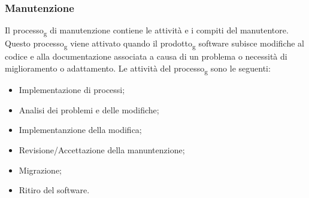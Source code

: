 \subsubsection{Manutenzione}
Il processo\textsubscript{g} di manutenzione contiene le attività e i compiti del manutentore. Questo processo\textsubscript{g} viene attivato quando il prodotto\textsubscript{g} software subisce modifiche al codice e alla documentazione associata a causa di un problema o necessità di miglioramento o adattamento.
Le attività del processo\textsubscript{g} sono le seguenti:
\begin{itemize}
\item Implementazione di processi;
\item Analisi dei problemi e delle modifiche;
\item Implementanzione della modifica;
\item Revisione/Accettazione della manuntenzione;
\item Migrazione;
\item Ritiro del software.
\end{itemize}


